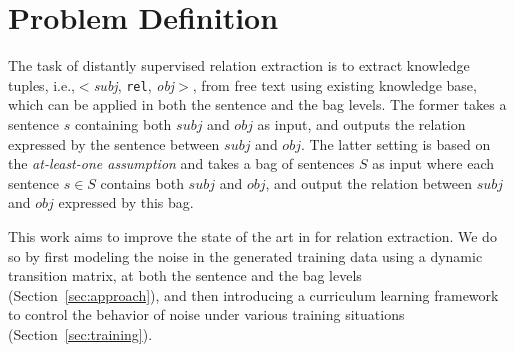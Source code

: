 \section{Problem Definition}
The task of distantly supervised relation extraction is to extract knowledge tuples, i.e.,$<$\emph{subj}, \texttt{rel}, \emph{obj}$>$, from free text using existing knowledge base, which can be applied in both the sentence and the bag
levels.  The former  takes a sentence $s$ containing both $subj$ and $obj$ as input, and outputs the relation expressed
by the sentence between $subj$ and $obj$. The latter setting is based on the \textit{at-least-one assumption}
 and takes a bag of sentences $S$ as input where each sentence
$s\in S$ contains both $subj$ and
$obj$, and output  the relation between $subj$ and $obj$ expressed by this bag.


This work aims to improve the state of the art in \DS for relation extraction.
We do so by first modeling the noise in the \DS generated training data using a dynamic transition matrix,  at both the sentence and the bag levels (Section~\ref{sec:approach}),  and then introducing a curriculum learning framework  to control the behavior of noise  under various training situations (Section~\ref{sec:training}).






